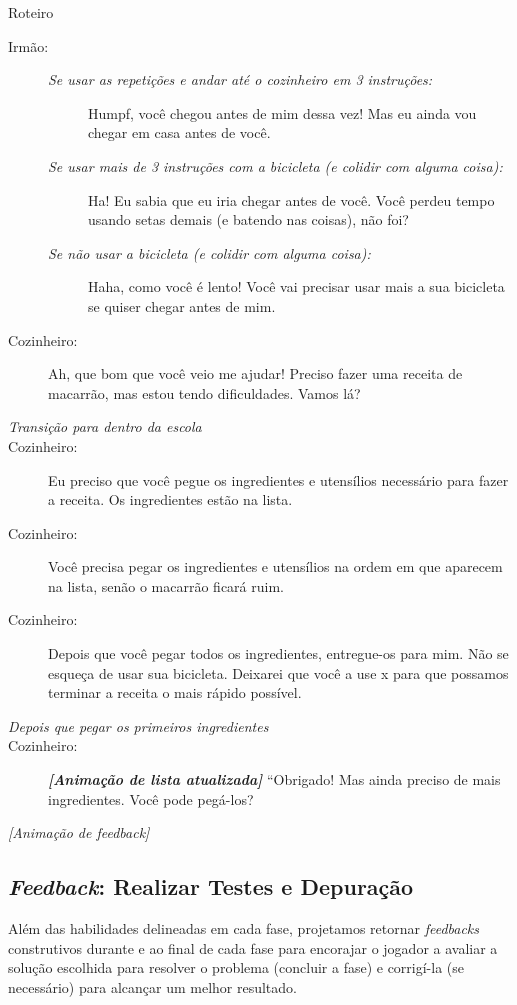 \begin{description}
	\item Roteiro
    \begin{description}
    	\item[Irmão:]
        \begin{description}
        	\item[]
            \item[\textit{Se usar as repetições e andar até o cozinheiro em 3 instruções:}] Humpf, você chegou antes de mim dessa vez! Mas eu ainda vou chegar em casa antes de você.
            \item[\textit{Se usar mais de 3 instruções com a bicicleta (e colidir com alguma coisa):}] Ha! Eu sabia que eu iria chegar antes de você. Você perdeu tempo usando setas demais (e batendo nas coisas), não foi?
			\item[\textit{Se não usar a bicicleta (e colidir com alguma coisa):}] Haha, como você é lento! Você vai precisar usar mais a sua bicicleta se quiser chegar antes de mim.
        \end{description}
        \item[Cozinheiro:] Ah, que bom que você veio me ajudar! Preciso fazer uma receita de macarrão, mas estou tendo dificuldades. Vamos lá?
        \item[\textit{Transição para dentro da escola}]
		\item[Cozinheiro:] Eu preciso que você pegue os ingredientes e utensílios necessário para fazer a receita. Os ingredientes estão na lista.
		\item[Cozinheiro:] Você precisa pegar os ingredientes e utensílios na ordem em que aparecem na lista, senão o macarrão ficará ruim.
		\item[Cozinheiro:] Depois que você pegar todos os ingredientes, entregue-os para mim. Não se esqueça de usar sua bicicleta. Deixarei que você a use x para que possamos terminar a receita o mais rápido possível.
        \item[\textit{Depois que pegar os primeiros ingredientes}] \item[Cozinheiro:] \textbf{\textit{[Animação de lista atualizada]}} “Obrigado! Mas ainda preciso de mais ingredientes. Você pode pegá-los?
        \item[\textit{[Animação de feedback]}]
    \end{description}
\end{description}

\subsection{\textit{Feedback}: Realizar Testes e Depuração} \label{ssec:feedback}

Além das habilidades delineadas em cada fase, projetamos retornar \textit{feedbacks} construtivos durante e ao final de cada fase para encorajar o jogador a avaliar a solução escolhida para resolver o problema (concluir a fase) e corrigí-la (se necessário) para alcançar um melhor resultado.


